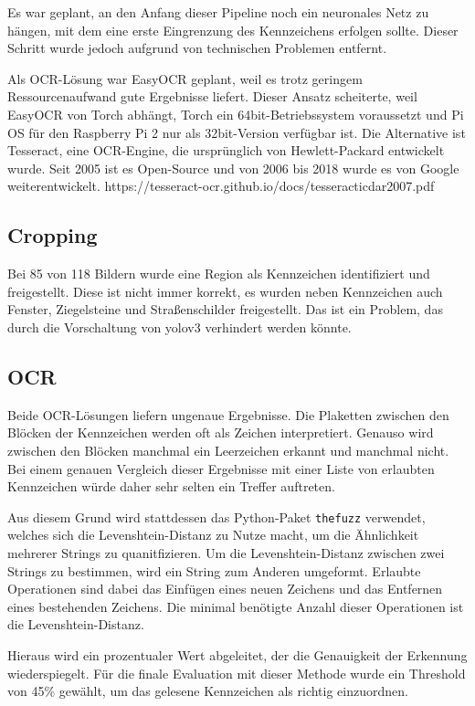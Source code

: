 Es war geplant, an den Anfang dieser Pipeline noch ein neuronales Netz zu hängen, mit dem eine erste Eingrenzung des Kennzeichens erfolgen sollte. Dieser Schritt wurde jedoch aufgrund von technischen Problemen entfernt.

Als OCR-Lösung war EasyOCR geplant, weil es trotz geringem Ressourcenaufwand gute Ergebnisse liefert. Dieser Ansatz scheiterte, weil EasyOCR von Torch abhängt, Torch ein 64bit-Betriebssystem voraussetzt und Pi OS für den Raspberry Pi 2 nur als 32bit-Version verfügbar ist.
Die Alternative ist Tesseract, eine OCR-Engine, die ursprünglich von Hewlett-Packard entwickelt wurde. Seit 2005 ist es Open-Source und von 2006 bis 2018 wurde es von Google weiterentwickelt. https://tesseract-ocr.github.io/docs/tesseracticdar2007.pdf

\subsection{Cropping}
Bei 85 von 118 Bildern wurde eine Region als Kennzeichen identifiziert und freigestellt.
Diese ist nicht immer korrekt, es wurden neben Kennzeichen auch Fenster, Ziegelsteine und Straßenschilder freigestellt.
Das ist ein Problem, das durch die Vorschaltung von yolov3 verhindert werden könnte. 



\subsection{OCR}
Beide OCR-Lösungen liefern ungenaue Ergebnisse. Die Plaketten zwischen den Blöcken der Kennzeichen werden oft als Zeichen interpretiert. Genauso wird zwischen den Blöcken manchmal ein Leerzeichen erkannt und manchmal nicht.
Bei einem genauen Vergleich dieser Ergebnisse mit einer Liste von erlaubten Kennzeichen würde daher sehr selten ein Treffer auftreten.

Aus diesem Grund wird stattdessen das Python-Paket \lstinline{thefuzz} verwendet, welches sich die Levenshtein-Distanz zu Nutze macht, um die Ähnlichkeit mehrerer Strings zu quanitfizieren.
Um die Levenshtein-Distanz zwischen zwei Strings zu bestimmen, wird ein String zum Anderen umgeformt. Erlaubte Operationen sind dabei das Einfügen eines neuen Zeichens und das Entfernen eines bestehenden Zeichens.
Die minimal benötigte Anzahl dieser Operationen ist die Levenshtein-Distanz.

Hieraus wird ein prozentualer Wert abgeleitet, der die Genauigkeit der Erkennung wiederspiegelt.
Für die finale Evaluation mit dieser Methode wurde ein Threshold von 45\% gewählt, um das gelesene Kennzeichen als richtig einzuordnen.

